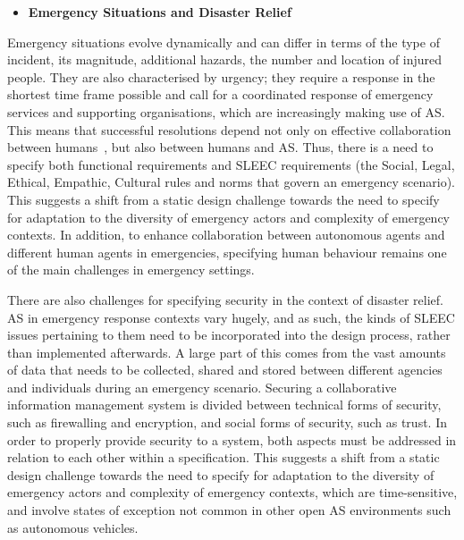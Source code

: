 \documentclass[sigconf,nonacm]{acmart}%
\begin{document}
	\begin{itemize}[leftmargin=0.5cm]
		\item \textbf{Emergency Situations and Disaster Relief}
	\end{itemize}
	Emergency situations evolve dynamically and can differ in terms of the type of incident, its magnitude, additional hazards, the number and location of injured people. They are also characterised by urgency; they require a response in the shortest time frame possible and call for a coordinated response of emergency services and supporting organisations, which are increasingly making use of AS. This means that successful resolutions depend not only on effective collaboration between humans~\cite{james2011organizational}, but also between humans and AS. Thus, there is a need to specify both functional requirements and SLEEC requirements (the Social, Legal, Ethical, Empathic, Cultural rules and norms that govern an emergency scenario). This suggests a shift from a static design challenge towards the need to specify for adaptation to the diversity of emergency actors and complexity of emergency contexts. In addition, to enhance collaboration between autonomous agents and different human agents in emergencies, specifying human behaviour remains one of the main challenges in emergency settings.

There are also challenges for specifying security in the context of disaster relief. AS in emergency response contexts vary hugely, and as such, the kinds of SLEEC issues pertaining to them need to be incorporated into the design process, rather than implemented afterwards.  A large part of this comes from the vast amounts of data that needs to be collected, shared and stored between different agencies and individuals during an emergency scenario. Securing a collaborative information management system is divided between technical forms of security, such as firewalling and encryption, and social forms of security, such as trust. In order to properly provide security to a system, both aspects must be addressed in relation to each other within a specification. This suggests a shift from a static design challenge towards the need to specify for adaptation to the diversity of emergency actors and complexity of emergency contexts, which are time-sensitive, and involve states of exception not common in other open AS environments such as autonomous vehicles.	
	
\end{document}
